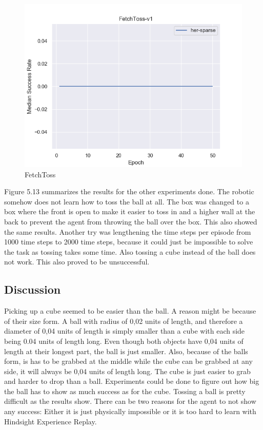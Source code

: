 \begin{figure} [h]
	
	\centering
	\includegraphics[width=1\textwidth]{figures/fig_FetchToss-v1.png}
	\caption{FetchToss}
	
\end{figure}
 
Figure 5.13 summarizes the results for the other experiments done.  The robotic somehow does not learn how to toss the ball at all. The box was changed to a box where the front is open to make it easier to toss in and a higher wall at the back to prevent the agent from throwing the ball over the box. This also showed the same results. Another try was lengthening the time steps per episode from 1000 time steps to 2000 time steps, because it could just be impossible to solve the task as tossing takes some time. Also tossing a cube instead of the ball does not work. This also proved to be unsuccessful. 

\subsection{Discussion}


Picking up a cube seemed to be easier than the ball. A reason might be because of their size form. A ball with radius of 0,02 units of length, and therefore a diameter of 0,04 units of length is simply smaller than a cube with each side being 0.04 units of length long. Even though both objects have 0,04 units of length at their longest part, the ball is just smaller. Also, because of the balls form, is has to be grabbed at the middle while the cube can be grabbed at any side, it will always be 0,04 units of length long. The cube is just easier to grab and harder to drop than a ball. Experiments could be done to figure out how big the ball has to show as much success as for the cube. 
Tossing a ball is pretty difficult as the results show. There can be two reasons for the agent to not show any success: Either it is just physically impossible or %
it is too hard to learn with Hindsight Experience Replay. 



